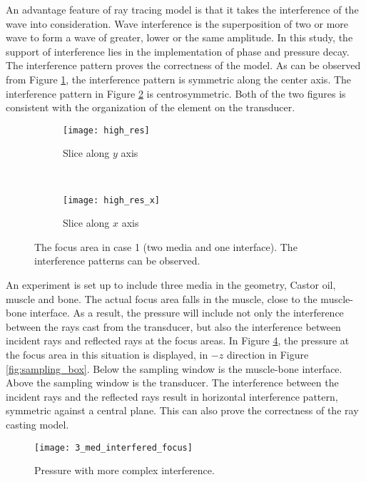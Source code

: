 An advantage feature of ray tracing model is that it takes the interference of the wave into consideration. Wave interference is the superposition of two or more wave to form a wave of greater, lower or the same amplitude. In this study, the support of interference lies in the implementation of phase and pressure decay. The interference pattern proves the correctness of the model. As can be observed from Figure \ref{fig:interference-a}, the interference pattern is symmetric along the center axis. The interference pattern in Figure \ref{fig:interference-b} is centrosymmetric. Both of the two figures is consistent with the organization of the element on the transducer.

\begin{figure}[h]
    \centering
    \begin{subfigure}[b]{0.45\textwidth}
        \texttt{[image: high\_res]}
        \caption{Slice along $y$ axis}
        \label{fig:interference-a}
    \end{subfigure}
    ~ %
    \begin{subfigure}[b]{0.45\textwidth}
        \texttt{[image: high\_res\_x]}
        \caption{Slice along $x$ axis}
        \label{fig:interference-b}
    \end{subfigure}
    \caption{The focus area in case 1 (two media and one interface). The interference patterns can be observed.} \label{fig:interference}
\end{figure}

An experiment is set up to include three media in the geometry, Castor oil, muscle and bone. The actual focus area falls in the muscle, close to the muscle-bone interface. As a result, the pressure will include not only the interference between the rays cast from the transducer, but also the interference between incident rays and reflected rays at the focus areas. In Figure \ref{fig:3_med_interfered_focus}, the pressure at the focus area in this situation is displayed, in $-z$ direction in Figure \ref{fig:sampling_box}. Below the sampling window is the muscle-bone interface. Above the sampling window is the transducer. The interference between the incident rays and the reflected rays result in horizontal interference pattern, symmetric against a central plane. This can also prove the correctness of the ray casting model. 

\begin{figure}[h]
    \centering
    \texttt{[image: 3\_med\_interfered\_focus]}
    \caption{Pressure with more complex interference.}
    \label{fig:3_med_interfered_focus}
\end{figure}


